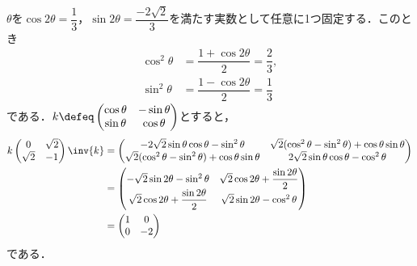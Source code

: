 \begin{npfwn}

  $ \theta $を$\cos 2\theta = \dfrac{1}{3} $，$\sin 2\theta = \dfrac{-2\sqrt{2}}{3} $を満たす実数として任意に1つ固定する．このとき
  \begin{align*}
    \cos^2 \theta &= \dfrac{1 +\cos 2\theta}{2} = \dfrac{2}{3},\\
    \sin^2 \theta &= \dfrac{1-\cos 2\theta}{2} = \dfrac{1}{3}
  \end{align*}
  である．$k \defeq
  \begin{pmatrix}
    \cos \theta & -\sin \theta \\ \sin \theta & \cos \theta
  \end{pmatrix}
  $とすると，
  \begin{align*}
    k
    \begin{pmatrix}
      0 & \sqrt{2} \\
      \sqrt{2} & -1 
    \end{pmatrix}\inv{k} &=
                           \begin{pmatrix}
                             -2\sqrt{2}\sin\theta \cos\theta  - \sin^2\theta & \sqrt{2}(\cos^2 \theta - \sin^2\theta) + \cos\theta \sin\theta \\
                             \sqrt{2}(\cos^2 \theta - \sin^2\theta) + \cos\theta \sin\theta  & 2\sqrt{2}\sin\theta \cos\theta  - \cos^2\theta
                           \end{pmatrix}\\
        &=
          \begin{pmatrix}
            -\sqrt{2}\sin 2\theta  - \sin^2\theta & \sqrt{2}\cos 2\theta + \dfrac{\sin 2\theta}{2} \\
            \sqrt{2}\cos 2\theta + \dfrac{\sin 2\theta}{2}  &\sqrt{2}\sin 2 \theta - \cos^2\theta
          \end{pmatrix}\\
        &=
          \begin{pmatrix}
            1  &  0\\ 0 & -2
          \end{pmatrix}
  \end{align*}
  である．


\end{npfwn}
